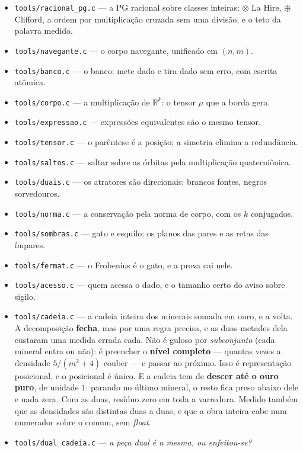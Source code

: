 \documentclass[11pt]{article}
\newcommand{\code}[1]{\texttt{\small #1}}
\newcommand{\R}{\mathbb R}
\theoremstyle{plain}
\theoremstyle{remark}
\begin{document}
\begin{itemize}\itemsep2pt
\item \code{tools/racional\_pg.c} --- a PG racional sobre classes inteiras: $\otimes$ La Hire,
$\oplus$ Clifford, a ordem por multiplicação cruzada sem uma divisão, e o teto da palavra medido.
\item \code{tools/navegante.c} --- o corpo navegante, unificado em $(n,m)$.
\item \code{tools/banco.c} --- o banco: mete dado e tira dado sem erro, com escrita atômica.
\item \code{tools/corpo.c} --- a multiplicação de $\R^k$: o tensor $\mu$ que a borda gera.
\item \code{tools/expressao.c} --- expressões equivalentes são o mesmo tensor.
\item \code{tools/tensor.c} --- o parêntese é a posição; a simetria elimina a redundância.
\item \code{tools/saltos.c} --- saltar sobre as órbitas pela multiplicação quaterniônica.
\item \code{tools/duais.c} --- os atratores são direcionais: brancos fontes, negros sorvedouros.
\item \code{tools/norma.c} --- a conservação pela norma de corpo, com os $k$ conjugados.
\item \code{tools/sombras.c} --- gato e esquilo: os planos das pares e as retas das ímpares.
\item \code{tools/fermat.c} --- o Frobenius é o gato, e a prova cai nele.
\item \code{tools/acesso.c} --- quem acessa o dado, e o tamanho certo do aviso sobre sigilo.
\item \code{tools/cadeia.c} --- a cadeia inteira dos minerais somada em ouro, e a volta.
A decomposição \textbf{fecha}, mas por uma regra precisa, e as duas metades dela custaram uma
medida errada cada. Não é guloso por \emph{subconjunto} (cada mineral entra ou não): é preencher
o \textbf{nível completo} --- quantas vezes a densidade $5/(m^2+4)$ couber --- e passar ao
próximo. Isso é representação posicional, e o posicional é único. E a cadeia tem de \textbf{descer
até o ouro puro}, de unidade $1$: parando no último mineral, o resto fica preso abaixo dele e
nada zera. Com as duas, resíduo zero em toda a varredura. Medido também que as densidades são
distintas duas a duas, e que a obra inteira cabe num numerador sobre o comum, sem \emph{float}.
\item \code{tools/dual\_cadeia.c} --- \emph{a peça dual é a mesma, ou enfeitou-se?}

\end{itemize}
\end{document}
